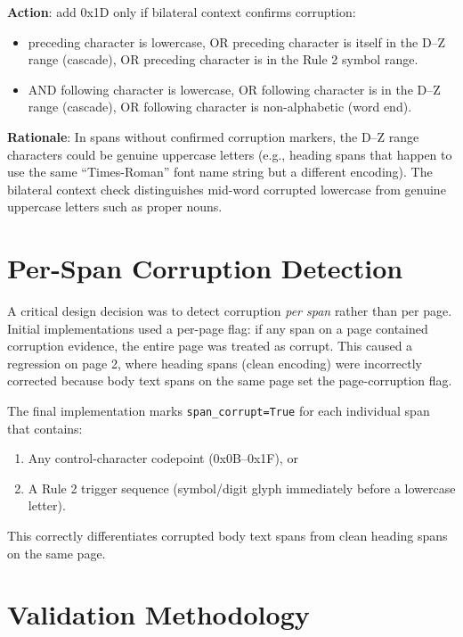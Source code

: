 \documentclass[12pt, a4paper]{report}
\newcommand{\codeinline}[1]{\texttt{#1}}
\begin{document}
\textbf{Action}: add 0x1D only if bilateral context confirms corruption:
\begin{itemize}[noitemsep]
  \item preceding character is lowercase, OR preceding character is itself
        in the D--Z range (cascade), OR preceding character is in the
        Rule 2 symbol range.
  \item AND following character is lowercase, OR following character is in
        the D--Z range (cascade), OR following character is non-alphabetic
        (word end).
\end{itemize}

\textbf{Rationale}: In spans without confirmed corruption markers, the D--Z
range characters could be genuine uppercase letters (e.g., heading spans that
happen to use the same ``Times-Roman'' font name string but a different
encoding). The bilateral context check distinguishes mid-word corrupted
lowercase from genuine uppercase letters such as proper nouns.

\section{Per-Span Corruption Detection}

A critical design decision was to detect corruption \emph{per span} rather than
per page. Initial implementations used a per-page flag: if any span on a page
contained corruption evidence, the entire page was treated as corrupt. This
caused a regression on page 2, where heading spans (clean encoding) were
incorrectly corrected because body text spans on the same page set the
page-corruption flag.

The final implementation marks \codeinline{span\_corrupt=True} for each
individual span that contains:
\begin{enumerate}[noitemsep]
  \item Any control-character codepoint (0x0B--0x1F), or
  \item A Rule 2 trigger sequence (symbol/digit glyph immediately before a
        lowercase letter).
\end{enumerate}

This correctly differentiates corrupted body text spans from clean heading
spans on the same page.

\section{Validation Methodology}
\end{document}
